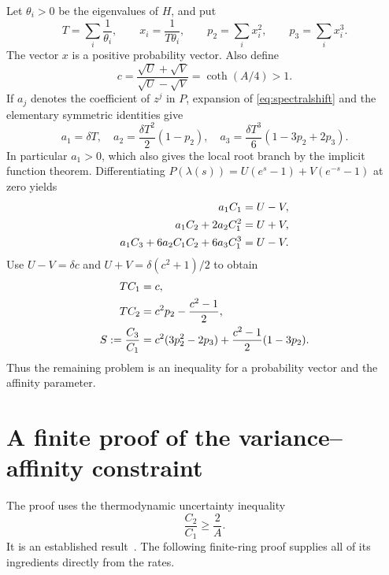 \documentclass[11pt,a4paper]{article}
\numberwithin{equation}{section}
\theoremstyle{remark}
\begin{document}
Let $\theta_i>0$ be the eigenvalues of $H$, and put
\begin{equation}\label{eq:moments}
  T=\sum_i\frac1{\theta_i},\qquad
  x_i=\frac1{T\theta_i},\qquad
  p_2=\sum_ix_i^2,\qquad p_3=\sum_ix_i^3.
\end{equation}
The vector $x$ is a positive probability vector. Also define
\begin{equation}\label{eq:c}
  c=\frac{\sqrt U+\sqrt V}{\sqrt U-\sqrt V}
   =\coth(A/4)>1.
\end{equation}
If $a_j$ denotes the coefficient of $z^j$ in $P$, expansion of
\eqref{eq:spectralshift} and the elementary symmetric identities give
\begin{equation}\label{eq:coefficients}
  a_1=\delta T,\quad
  a_2=\frac{\delta T^2}{2}(1-p_2),\quad
  a_3=\frac{\delta T^3}{6}(1-3p_2+2p_3).
\end{equation}
In particular $a_1>0$, which also gives the local root branch by the implicit
function theorem. Differentiating
$P(\lambda(s))=U(e^s-1)+V(e^{-s}-1)$ at zero yields
\begin{align}
 a_1C_1&=U-V,\notag\\
 a_1C_2+2a_2C_1^2&=U+V,\label{eq:cumulantcoeff}\\
 a_1C_3+6a_2C_1C_2+6a_3C_1^3&=U-V.\notag
\end{align}
Use $U-V=\delta c$ and $U+V=\delta(c^2+1)/2$ to obtain
\begin{align}
 TC_1&=c,\notag\\
 TC_2&=c^2p_2-\frac{c^2-1}{2},\label{eq:ratios}\\
 S:=\frac{C_3}{C_1}
   &=c^2(3p_2^2-2p_3)+\frac{c^2-1}{2}(1-3p_2).\notag
\end{align}
Thus the remaining problem is an inequality for a probability vector and
the affinity parameter.

\section{A finite proof of the variance--affinity constraint}\label{sec:TUR}

The proof uses the thermodynamic uncertainty inequality
\begin{equation}\label{eq:TUR}
  \frac{C_2}{C_1}\ge\frac2A.
\end{equation}
It is an established result~\cite{Gingrich2016}. The following finite-ring
proof supplies all of its ingredients directly from the rates.
\end{document}
